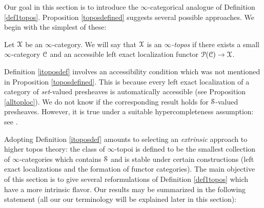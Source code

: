 Our goal in this section is to introduce the $\infty$-categorical analogue of Definition \ref{def1topos}.
Proposition \ref{toposdefined} suggests several possible approaches. We begin with the simplest of these:

\begin{definition}\label{itoposdef}
Let $\operatorname{\mathcal{X}}$ be an $\infty$-category. We will say that $\operatorname{\mathcal{X}}$ is an {\it $\infty$-topos} if there
exists a small $\infty$-category $\operatorname{\mathcal{C}}$ and an accessible left exact localization functor
$\operatorname{\mathcal{P}}(\operatorname{\mathcal{C}}) \rightarrow \operatorname{\mathcal{X}}$. 
\end{definition}

\begin{remark}
Definition \ref{itoposdef} involves an accessibility condition which was not
mentioned in Proposition \ref{toposdefined}. This is because every left exact localization of a
category of {\em set}-valued presheaves is automatically accessible (see Proposition \ref{alltoploc}). We do not know if the corresponding result holds for $\operatorname{\mathcal{S}}$-valued presheaves. However,
it is true under a suitable hypercompleteness assumption:
see \cite{toenvezz}.
\end{remark}

Adopting Definition \ref{itoposdef} amounts to selecting an {\em extrinsic} approach to higher topos theory: the class of $\infty$-topoi is defined to be the smallest collection of $\infty$-categories which contains $\operatorname{\mathcal{S}}$ and is stable under certain constructions (left exact localizations and the formation of functor categories). The main objective of this section is to give several reformulations of Definition \ref{def1topos} which have a more intrinsic flavor. Our results may be summarized in the following statement (all our our terminology will be explained later in this section):

